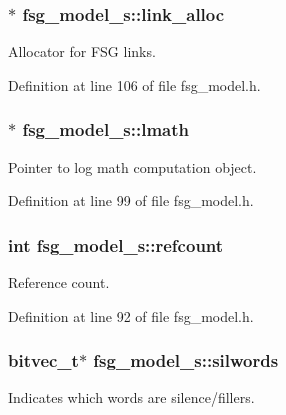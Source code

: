 \subsubsection[{link\-\_\-alloc}]{$\ast$ fsg\-\_\-model\-\_\-s\-::link\-\_\-alloc}\label{structfsg__model__s_ac4e2a36305bbe62a5c7468588eb058b1}


Allocator for F\-S\-G links. 



Definition at line 106 of file fsg\-\_\-model.\-h.

\subsubsection[{lmath}]{$\ast$ fsg\-\_\-model\-\_\-s\-::lmath}\label{structfsg__model__s_ab0b22dadb593ee1901829f89c4a47fe2}


Pointer to log math computation object. 



Definition at line 99 of file fsg\-\_\-model.\-h.

\subsubsection[{refcount}]{\setlength{\rightskip}{0pt plus 5cm}int fsg\-\_\-model\-\_\-s\-::refcount}\label{structfsg__model__s_af329127556a42f6ea3b27f41a99a0b17}


Reference count. 



Definition at line 92 of file fsg\-\_\-model.\-h.

\subsubsection[{silwords}]{\setlength{\rightskip}{0pt plus 5cm}bitvec\-\_\-t$\ast$ fsg\-\_\-model\-\_\-s\-::silwords}\label{structfsg__model__s_ab5709e67c1b7506ab024f2060d50331c}


Indicates which words are silence/fillers. 



